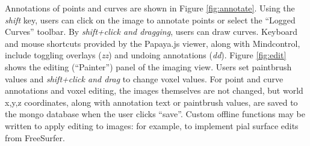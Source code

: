 Annotations of points and curves are shown in Figure \ref{fig:annotate}. Using the \textit{shift} key, users can click on the image to annotate points or select the ``Logged Curves'' toolbar. By \textit{shift+click and dragging}, users can draw curves. Keyboard and mouse shortcuts provided by the Papaya.js viewer, along with Mindcontrol, include toggling overlays (\textit{zz}) and undoing annotations (\textit{dd}). Figure \ref{fig:edit} shows the editing (``Painter'') panel of the imaging view. Users set paintbrush values and \textit{shift+click and drag} to change voxel values. For point and curve annotations and voxel editing, the images themselves are not changed, but world x,y,z coordinates, along with annotation text or paintbrush values, are saved to the mongo database when the user clicks ``save''. Custom offline functions may be written to apply editing to images: for example, to implement pial surface edits from FreeSurfer. 